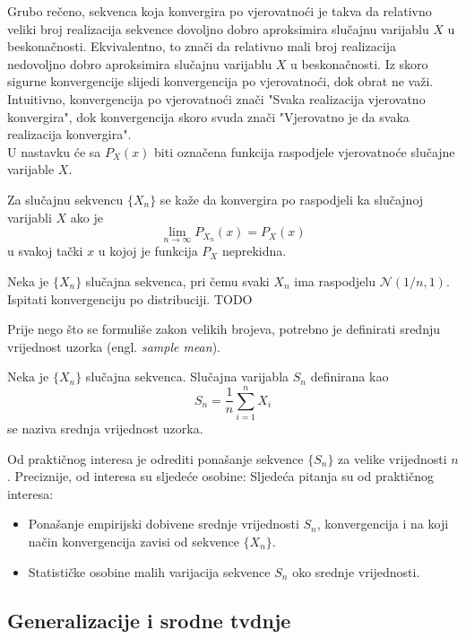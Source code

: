 Grubo rečeno, sekvenca koja konvergira po vjerovatnoći je takva da relativno
veliki broj realizacija sekvence dovoljno dobro aproksimira slučajnu varijablu
$X$ u beskonačnosti. Ekvivalentno, to znači da relativno mali broj realizacija
nedovoljno dobro aproksimira slučajnu varijablu $X$ u beskonačnosti. Iz skoro
sigurne konvergencije slijedi konvergencija po vjerovatnoći, dok obrat ne važi.
Intuitivno, konvergencija po vjerovatnoći znači "Svaka realizacija
vjerovatno konvergira", dok konvergencija skoro svuda znači "Vjerovatno je da
svaka realizacija konvergira". \\

U nastavku će sa $P_X(x)$ biti označena funkcija raspodjele
vjerovatnoće slučajne varijable $X$.
\begin{definition}
  Za slučajnu sekvencu $\{X_n\}$ se kaže da konvergira po raspodjeli ka
  slučajnoj varijabli $X$ ako je
  \begin{equation}
    \lim_{n\to\infty} P_{X_n}(x) = P_X(x)
  \end{equation}
  u svakoj tački $x$ u kojoj je funkcija $P_X$ neprekidna.
\end{definition}

\begin{exmp}
  Neka je $\{X_n\}$ slučajna sekvenca, pri čemu svaki $X_n$ ima raspodjelu
  $\mathcal{N}(1/n, 1)$. Ispitati konvergenciju po distribuciji. TODO
\end{exmp}

Prije nego što se formuliše zakon velikih brojeva, potrebno je definirati
srednju vrijednost uzorka (engl. \textit{sample mean}).
\begin{definition}

  Neka je $\{X_n\}$ slučajna sekvenca. Slučajna varijabla $S_n$
  definirana kao 
  \begin{equation} \label{eq:sample-mean}
    S_n = \frac{1}{n} \sum_{i=1}^{n} X_i
  \end{equation}
  se naziva srednja vrijednost uzorka.

\end{definition}
Od praktičnog interesa je odrediti ponašanje sekvence $\{S_n\}$ za velike
vrijednosti $n$. Preciznije, od interesa su sljedeće osobine:
Sljedeća pitanja su od praktičnog interesa:
\begin{itemize}
  \item Ponašanje empirijski dobivene srednje vrijednosti $S_n$, konvergencija i
    na koji način konvergencija zavisi od sekvence $\{X_n\}$.
  \item Statističke osobine malih varijacija sekvence $S_n$ oko srednje
    vrijednosti.
\end{itemize}

\subsection{Generalizacije i srodne tvdnje}

